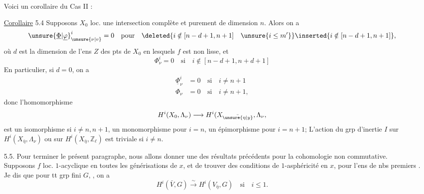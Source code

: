 
Voici un corollaire du Cas II :

\uline{Corollaire} 5.4 Supposons  $X_0$ loc. une intersection complète et purement de dimension $n$. Alors on a
\[
{\unsure{\underline{\Phi}|\underline{\varphi}}}^i_{\unsure{\nu|v}}=0\quad\text{pour}\quad
\deleted{i\notin[n-d+1,n+1]\quad\unsure{i\leq m'}}\inserted{i\notin[n-d+1,n+1]},
\]
où $d$ est la dimension de l'ens $Z$ des pts de $X_0$ en lesquels $f$ est non lisse,  et
\[
\Phi^i_\nu=0\quad\text{si}\quad i\notin[n-d+1,n+d+1]
\]
En particulier, si $d=0$, on a
\[
\begin{aligned}
\underline{\Phi}^i_\nu&=0\quad\text{si}\quad i\neq n+1\\
\Phi_\nu&=0\quad\text{si}\quad i\neq n+1,
\end{aligned}
\]
donc l'homomorphisme
\[
H^i(X_0,\Lambda_\nu)\longrightarrow H^i(X_{\bar{\unsure{\eta|y}}},\Lambda_\nu,
\]
est un isomorphisme si $i\neq n,n+1$, un monomorphisme pour $i=n$, un épimorphisme pour $i=n+1$;  L'action du grp d'inertie  $I$ sur $H^i(X_{\bar{\eta}},\Lambda_\nu)$  ou sur $H^i(X_{\bar{\eta}},\mathbb{Z}_\ell)$ est triviale si $i\neq n$.

5.5. Pour terminer le présent paragraphe, nous allons donner une  des résultats précédents pour la cohomologie non commutative. Supposons $f$ loc. $1$-acyclique  en toutes les générisations de $x$,  et  de  trouver des conditions de  $1$-asphéricité en $x$, pour l'ens de nbs premiers .
Je dis que pour tt grp fini $G$, , on a
\[
H^i(\bar{V},G)\xrightarrow{\sim}H^i(V_{\bar{\eta}},G)\quad\text{si}\quad i\leq1.
\tag*{(5.5.1)}
\]

